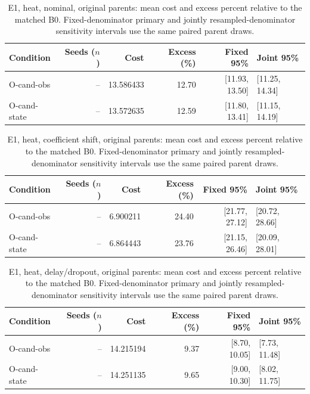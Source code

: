 \begin{table}[ht]
\centering\small
\caption{E1, heat, nominal, original parents: mean cost and excess percent relative to the matched B0. Fixed-denominator primary and jointly resampled-denominator sensitivity intervals use the same paired parent draws.}\label{tab:revision_cost_E1_heat_locked_nominal}
\begin{tabular}{@{}lrrrrl@{}}\toprule
Condition & Seeds ($n$) & Cost & Excess (\%) & Fixed 95\% & Joint 95\%\\\midrule
O-cand-obs & -- & 13.586433 & 12.70 & [11.93, 13.50] & [11.25, 14.34]\\
O-cand-state & -- & 13.572635 & 12.59 & [11.80, 13.41] & [11.15, 14.19]\\
\bottomrule\end{tabular}
\end{table}

\begin{table}[ht]
\centering\small
\caption{E1, heat, coefficient shift, original parents: mean cost and excess percent relative to the matched B0. Fixed-denominator primary and jointly resampled-denominator sensitivity intervals use the same paired parent draws.}\label{tab:revision_cost_E1_heat_locked_coefficient_ood}
\begin{tabular}{@{}lrrrrl@{}}\toprule
Condition & Seeds ($n$) & Cost & Excess (\%) & Fixed 95\% & Joint 95\%\\\midrule
O-cand-obs & -- & 6.900211 & 24.40 & [21.77, 27.12] & [20.72, 28.66]\\
O-cand-state & -- & 6.864443 & 23.76 & [21.15, 26.46] & [20.09, 28.01]\\
\bottomrule\end{tabular}
\end{table}

\begin{table}[ht]
\centering\small
\caption{E1, heat, delay/dropout, original parents: mean cost and excess percent relative to the matched B0. Fixed-denominator primary and jointly resampled-denominator sensitivity intervals use the same paired parent draws.}\label{tab:revision_cost_E1_heat_locked_delay_dropout}
\begin{tabular}{@{}lrrrrl@{}}\toprule
Condition & Seeds ($n$) & Cost & Excess (\%) & Fixed 95\% & Joint 95\%\\\midrule
O-cand-obs & -- & 14.215194 & 9.37 & [8.70, 10.05] & [7.73, 11.48]\\
O-cand-state & -- & 14.251135 & 9.65 & [9.00, 10.30] & [8.02, 11.75]\\
\bottomrule\end{tabular}
\end{table}

